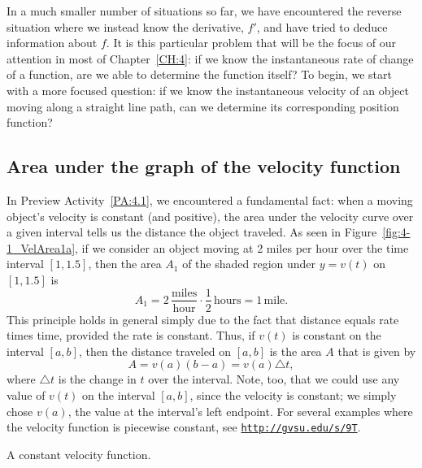 In a much smaller number of situations so far, we have encountered the reverse situation where we instead know the derivative, $f'$, and have tried to deduce information about $f$.  It is this particular problem that will be the focus of our attention in most of Chapter~\ref{CH:4}: if we know the instantaneous rate of change of a function, are we able to determine the function itself?  To begin, we start with a more focused question:  if we know the instantaneous velocity of an object moving along a straight line path, can we determine its corresponding position function? 


\subsection*{Area under the graph of the velocity function}

In Preview Activity~\ref{PA:4.1}, we encountered a fundamental fact:  when a moving object's velocity is constant (and positive), the area under the velocity curve over a given interval tells us the distance the object traveled.   
As seen in Figure~\ref{fig:4-1_VelArea1a}, if we consider an object moving at 2 miles per hour over the time interval $[1,1.5]$, then the area $A_1$ of the shaded region under $y = v(t)$ on $[1,1.5]$ is
\[ A _1= 2 \, \frac{\mbox{miles}}{\mbox{hour}} \cdot \frac{1}{2} \, \mbox{hours} = 1 \, \mbox{mile}. \] 
This principle holds in general simply due to the fact that distance equals rate times time, provided the rate is constant.  Thus, if $v(t)$ is constant on the interval $[a,b]$, then the distance traveled on $[a,b]$ is the area $A$ that is given by 
\[ A = v(a) (b-a) = v(a) \triangle t, \]
where $\triangle t$ is the change in $t$ over the interval.  Note, too, that we could use any value of $v(t)$ on the interval $[a,b]$, since the velocity is constant; we simply chose $v(a)$, the value at the interval's left endpoint.  For several examples where the velocity function is piecewise constant, see \href{http://gvsu.edu/s/9T}{\texttt{http://gvsu.edu/s/9T}}.

\begin{marginfigure}[-7cm] %
\caption{A constant velocity function.} \label{fig:4-1_VelArea1a}
\end{marginfigure}

